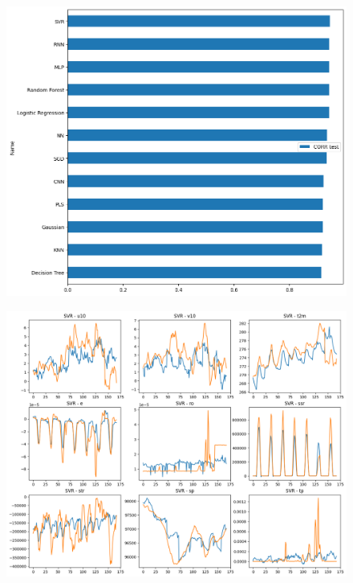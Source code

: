 \begin{figure}[H]
    \centering
    \includegraphics[width=\textwidth]{images/corr_ranking.png}
    \caption{}
    \label{corr-ranking}
\end{figure}

\begin{figure}[H]
    \centering
    \includegraphics[width=\textwidth]{images/SVR_week.png}
    \caption{}
    \label{svr-week}
\end{figure}

